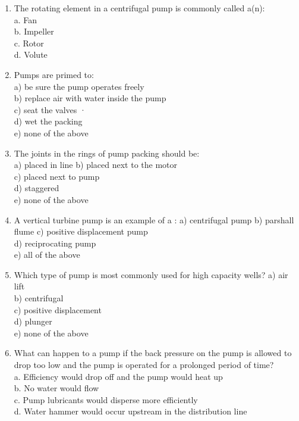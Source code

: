 \begin{enumerate}[1.]
\item The rotating element in a centrifugal pump is commonly called a(n):\\
a. Fan\\
b. Impeller\\
c. Rotor\\
d. Volute\\

\item Pumps are primed to:\\
a) be sure the pump operates freely\\
b) replace air with water inside the pump\\
c) seat the valves ·\\
d) wet the packing\\
e) none of the above\\

\item The joints in the rings of pump packing should be:\\
a) placed in line
b) placed next to the motor\\
c) placed next to pump\\
d) staggered\\
e) none of the above\\

\item A vertical turbine pump is an example of a :
a) centrifugal pump
b) parshall flume
c) positive displacement pump\\
d) reciprocating pump\\
e) all of the above\\

\item  Which type of pump is most commonly used for high capacity wells?
a) air lift\\
b) centrifugal\\
c) positive displacement\\
d) plunger\\
e) none of the above\\

\item What can happen to a pump if the back pressure on the pump is allowed to drop too low and the pump is operated for a prolonged period of time?\\
a. Efficiency would drop off and the pump would heat up\\
b. No water would flow\\
c. Pump lubricants would disperse more efficiently\\
d. Water hammer would occur upstream in the distribution line\\


\end{enumerate}
